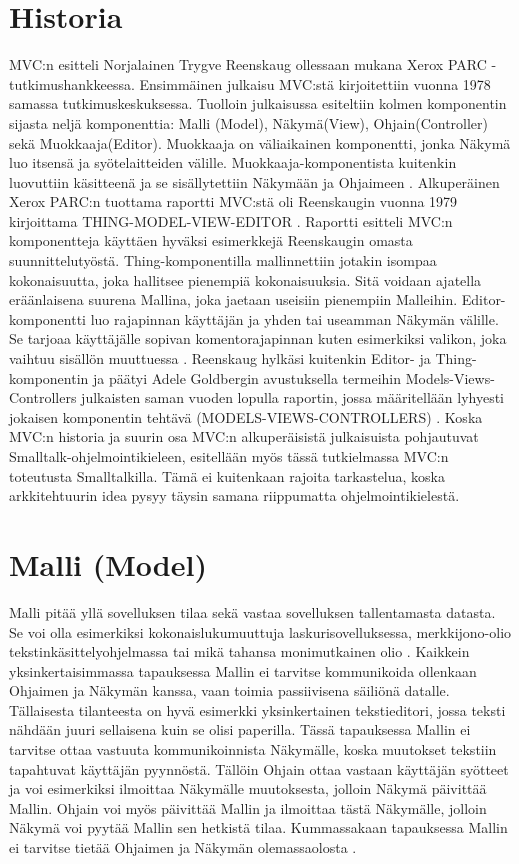 \documentclass[utf8]{gradu3}
\begin{document}
\section{Historia}
MVC:n esitteli Norjalainen Trygve Reenskaug ollessaan mukana Xerox PARC -tutkimushankkeessa. 
Ensimmäinen julkaisu MVC:stä kirjoitettiin vuonna 1978 samassa tutkimuskeskuksessa. 
Tuolloin julkaisussa esiteltiin kolmen komponentin sijasta neljä komponenttia: 
Malli (Model), Näkymä(View), Ohjain(Controller) sekä Muokkaaja(Editor). Muokkaaja on 
väliaikainen komponentti, jonka Näkymä luo itsensä ja syötelaitteiden välille. 
Muokkaaja-komponentista kuitenkin luovuttiin käsitteenä ja se sisällytettiin Näkymään 
ja Ohjaimeen \parencite{xerox}. Alkuperäinen Xerox PARC:n tuottama raportti MVC:stä oli Reenskaugin 
vuonna 1979 kirjoittama THING-MODEL-VIEW-EDITOR \parencite{xerox-thing}. Raportti esitteli MVC:n 
komponentteja käyttäen hyväksi esimerkkejä Reenskaugin omasta suunnittelutyöstä. Thing-komponentilla mallinnettiin
jotakin isompaa kokonaisuutta, joka hallitsee pienempiä kokonaisuuksia. Sitä voidaan ajatella eräänlaisena suurena Mallina, joka jaetaan useisiin pienempiin Malleihin. Editor-komponentti luo rajapinnan käyttäjän ja yhden tai useamman Näkymän välille. Se tarjoaa käyttäjälle sopivan komentorajapinnan kuten esimerkiksi valikon, joka vaihtuu sisällön muuttuessa \parencite{xerox-thing}. Reenskaug hylkäsi kuitenkin Editor- ja Thing-komponentin ja päätyi Adele Goldbergin avustuksella termeihin Models-Views-Controllers julkaisten saman vuoden lopulla raportin, jossa määritellään lyhyesti jokaisen komponentin tehtävä (MODELS-VIEWS-CONTROLLERS) \parencite{xerox-original}. Koska MVC:n historia ja suurin osa MVC:n alkuperäisistä julkaisuista pohjautuvat Smalltalk-ohjelmointikieleen, esitellään myös tässä tutkielmassa MVC:n toteutusta Smalltalkilla.
Tämä ei kuitenkaan rajoita tarkastelua, koska arkkitehtuurin idea pysyy täysin samana riippumatta ohjelmointikielestä.


\section{Malli (Model)}
Malli pitää yllä sovelluksen tilaa sekä vastaa sovelluksen tallentamasta datasta. Se voi olla esimerkiksi kokonaislukumuuttuja laskurisovelluksessa, merkkijono-olio tekstinkäsittelyohjelmassa tai
mikä tahansa monimutkainen olio \parencite[s. 3]{krasner_desc}. Kaikkein yksinkertaisimmassa tapauksessa Mallin ei tarvitse kommunikoida ollenkaan Ohjaimen ja Näkymän kanssa, vaan toimia passiivisena säiliönä datalle.
Tällaisesta tilanteesta on hyvä esimerkki yksinkertainen tekstieditori, jossa teksti nähdään juuri sellaisena kuin se olisi paperilla. Tässä tapauksessa Mallin ei tarvitse ottaa vastuuta
kommunikoinnista Näkymälle, koska muutokset tekstiin tapahtuvat käyttäjän pyynnöstä. Tällöin Ohjain ottaa vastaan käyttäjän syötteet ja voi esimerkiksi ilmoittaa Näkymälle muutoksesta, jolloin Näkymä
päivittää Mallin. Ohjain voi myös päivittää Mallin ja ilmoittaa tästä Näkymälle, jolloin Näkymä voi pyytää Mallin sen hetkistä tilaa. Kummassakaan tapauksessa Mallin ei tarvitse tietää Ohjaimen ja Näkymän
olemassaolosta \parencite{burbeck}.
\end{document}
